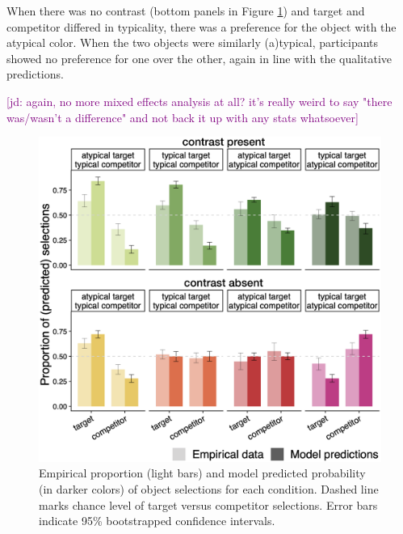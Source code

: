 \documentclass[10pt,letterpaper]{article}
\newcommand{\jd}[1]{\textcolor{Purple}{[jd: #1]}}
\newcommand{\figref}[1]{Figure \ref{#1}}
\begin{document}
When there was no contrast (bottom panels in \figref{modelcompr-results}) and target and competitor differed in typicality, there was a preference for the object with the atypical color. When the two objects were similarly (a)typical, participants showed no preference for one over the other, again in line with the qualitative predictions.

\jd{again, no more mixed effects analysis at all? it's really weird to say "there was/wasn't a difference" and not back it up with any stats whatsoever}



\begin{figure}
	\begin{center}
		\includegraphics[width=.475\textwidth]{graphs/model-bycond-paper.pdf}
	\end{center}
\caption{Empirical proportion  (light bars) and model predicted probability (in darker colors) of object selections for each condition. Dashed line marks chance level of target versus competitor selections. Error bars indicate 95\% bootstrapped confidence intervals.} %
\label{modelcompr-results}
\end{figure}
\end{document}
